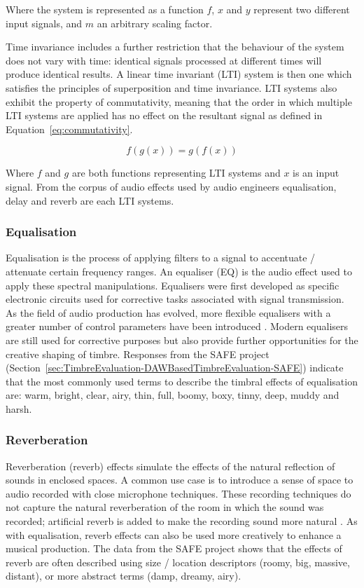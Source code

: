 		Where the system is represented as a function $f$, $x$ and $y$ represent two different input signals, and
		$m$ an arbitrary scaling factor.

		Time invariance includes a further restriction that the behaviour of the system does not vary with time:
		identical signals processed at different times will produce identical results. A linear time invariant
		(LTI) system is then one which satisfies the principles of superposition and time invariance. LTI systems
		also exhibit the property of commutativity, meaning that the order in which multiple LTI systems are
		applied has no effect on the resultant signal as defined in Equation~\ref{eq:commutativity}.

		\begin{equation} f(g(x)) = g(f(x)) \label{eq:commutativity} \end{equation}

		Where $f$ and $g$ are both functions representing LTI systems and $x$ is an input signal. From the corpus
		of audio effects used by audio engineers equalisation, delay and reverb are each LTI systems.

		\subsubsection*{Equalisation}
			Equalisation is the process of applying filters to a signal to accentuate / attenuate certain
			frequency ranges. An equaliser (EQ) is the audio effect used to apply these spectral manipulations.
			Equalisers were first developed as specific electronic circuits used for corrective tasks
			associated with signal transmission. As the field of audio production has evolved, more flexible
			equalisers with a greater number of control parameters have been introduced
			\citep{gottlieb2007shaping}. Modern equalisers are still used for corrective purposes but also
			provide further opportunities for the creative shaping of timbre. Responses from the SAFE project
			(Section~\ref{sec:TimbreEvaluation-DAWBasedTimbreEvaluation-SAFE}) indicate that the most commonly
			used terms to describe the timbral effects of equalisation are: warm, bright, clear, airy, thin,
			full, boomy, boxy, tinny, deep, muddy and harsh.

		\subsubsection*{Reverberation}
			Reverberation (reverb) effects simulate the effects of the natural reflection of sounds in enclosed
			spaces. A common use case is to introduce a sense of space to audio recorded with close microphone
			techniques. These recording techniques do not capture the natural reverberation of the room in
			which the sound was recorded; artificial reverb is added to make the recording sound more natural
			\citep{gottlieb2007shaping}. As with equalisation, reverb effects can also be used more creatively
			to enhance a musical production. The data from the SAFE project shows that the effects of
			reverb are often described using size / location descriptors (roomy, big, massive, distant), or
			more abstract terms (damp, dreamy, airy).

